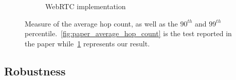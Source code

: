 \documentclass{beamer}
\begin{document}
\begin{frame}
\begin{figure}
\begin{subfigure}{.5\textwidth}
  \caption{WebRTC implementation}
  \label{fig:my_average_hop_count}
\end{subfigure}
\caption{Measure of the average hop count, as well as the $90^{th}$ and $99^{th}$ percentile.~\ref{fig:paper_average_hop_count} is the test reported in the paper while~\ref{fig:my_average_hop_count} represents our result.}
\label{fig:freshness}
\end{figure}
\end{frame}

\subsection{Robustness}
\end{document}
